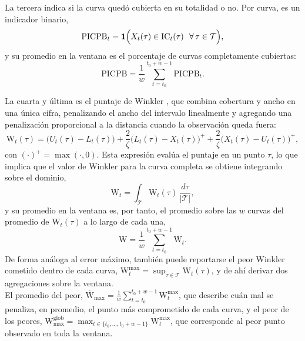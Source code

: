 La tercera indica si la curva quedó cubierta en su totalidad o no. Por curva, es un indicador binario,
\begin{equation}
    \mathrm{PICPB}_t =
    \mathbf{1}\Bigl(X_t(\tau) \in \mathrm{IC}_t(\tau)\ \ \forall\, \tau \in \mathcal{T}\Bigr),
\end{equation}
y su promedio en la ventana es el porcentaje de curvas completamente cubiertas:
\begin{equation}
    \mathrm{PICPB} = \frac{1}{w}\sum_{t=t_0}^{t_0+w-1}
    \mathrm{PICPB}_t.
\end{equation}

La cuarta y última es el puntaje de Winkler \citep{02_02_winkler1972decision, 02_02_gneiting2007scoring}, que combina cobertura y ancho en una única cifra, penalizando el ancho del intervalo linealmente y agregando una penalización proporcional a la distancia cuando la observación queda fuera:
\begin{equation}
    \mathrm{W}_t(\tau) = \bigl(U_t(\tau) - L_t(\tau)\bigr)
    + \frac{2}{\zeta}\bigl(L_t(\tau) - X_t(\tau)\bigr)^{+}
    + \frac{2}{\zeta}\bigl(X_t(\tau) - U_t(\tau)\bigr)^{+},
\end{equation}
con $(\cdot)^+ = \max(\cdot, 0)$. Esta expresión evalúa el puntaje en un punto $\tau$, lo que implica que el valor de Winkler para la curva completa se obtiene integrando sobre el dominio,
\begin{equation}
    \mathrm{W}_t = \int_{\mathcal{T}} \mathrm{W}_t(\tau)\, \frac{d\tau}{|\mathcal{T}|},
\end{equation}
y su promedio en la ventana es, por tanto, el promedio sobre las $w$ curvas del promedio de $\mathrm{W}_t(\tau)$ a lo largo de cada una,
\begin{equation}
    \mathrm{W} = \frac{1}{w}\sum_{t=t_0}^{t_0+w-1} \mathrm{W}_t.
\end{equation}
De forma análoga al error máximo, también puede reportarse el peor Winkler cometido dentro de cada curva, $\mathrm{W}_t^{\max} = \sup_{\tau \in \mathcal{T}} \mathrm{W}_t(\tau)$, y de ahí derivar dos agregaciones sobre la ventana.\\

El promedio del peor, $\overline{\mathrm{W}}_{\max} =
\frac{1}{w}\sum_{t=t_0}^{t_0+w-1} \mathrm{W}_t^{\max}$, que describe cuán mal se penaliza, en promedio, el punto más comprometido de cada curva, y el peor de los peores, $\mathrm{W}_{\max}^{\mathrm{glob}} = \max_{t \in
\{t_0, \dots, t_0+w-1\}} \mathrm{W}_t^{\max}$, que corresponde al peor punto observado en toda la ventana. 


